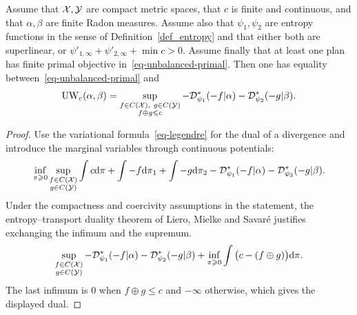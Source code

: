 \begin{prop}\label{prop-dual-unbalanced-ot}
Assume that $\mathcal{X},\mathcal{Y}$ are compact metric spaces, that $c$ is finite and continuous, and that $\alpha,\beta$ are finite Radon measures. Assume also that $\psi_1,\psi_2$ are entropy functions in the sense of Definition~\ref{def_entropy} and that either both are superlinear, or
$\psi'_{1,\infty}+\psi'_{2,\infty}+\min c>0$.
Assume finally that at least one plan has finite primal objective in~\eqref{eq-unbalanced-primal}.
Then one has equality between~\eqref{eq-unbalanced-primal} and
\[
\operatorname{UW}_c(\alpha,\beta)
=
\sup_{\substack{f\in C(\mathcal{X}),\ g\in C(\mathcal{Y})\\ f\oplus g\leqslant c}}
-
\mathcal{D}_{\psi_1}^*(-f|\alpha)
-
\mathcal{D}_{\psi_2}^*(-g|\beta).
\]
\end{prop}
\begin{proof}
Use the variational formula~\eqref{eq-legendre} for the dual of a divergence and introduce the marginal variables through continuous potentials:
\[
\inf_{\pi\geqslant0}\sup_{\substack{f\in C(\mathcal{X})\\g\in C(\mathcal{Y})}}
\int c\mathrm{d}\pi + \int -f\mathrm{d}\pi_1 + \int -g\mathrm{d}\pi_2
-
\mathcal{D}_{\psi_1}^*(-f|\alpha)
-
\mathcal{D}_{\psi_2}^*(-g|\beta).
\]
Under the compactness and coercivity assumptions in the statement, the
entropy--transport duality theorem of Liero, Mielke and Savar\'e
justifies exchanging the infimum and the supremum.
\[
\sup_{\substack{f\in C(\mathcal{X})\\g\in C(\mathcal{Y})}}
-
\mathcal{D}_{\psi_1}^*(-f|\alpha)
-
\mathcal{D}_{\psi_2}^*(-g|\beta)
+
\inf_{\pi\geqslant0}\int\big(c-(f\oplus g)\big)\mathrm{d}\pi.
\]
The last infimum is $0$ when $f\oplus g\leq c$ and $-\infty$ otherwise, which gives the displayed dual.
\end{proof}
